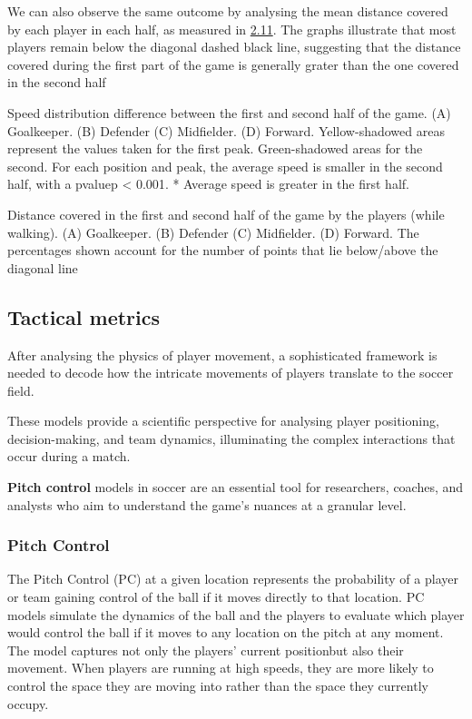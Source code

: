 \documentclass[twoside,nohyper]{tufte-book}
\begin{document}
We can also observe the same outcome by analysing the mean distance
covered by each player in each half, as measured in
\protect\hyperlink{f2.11}{2.11}. The graphs
illustrate that most players remain below the diagonal dashed black
line, suggesting that the distance covered during the first part of the
game is generally grater than the one covered in the second half

Speed distribution difference between the first and second
half of the game. (A) Goalkeeper. (B)
Defender (C) Midfielder. (D) Forward.
Yellow-shadowed areas represent the values taken for the first peak.
Green-shadowed areas for the second. For each position and peak, the
average speed is smaller in the second half, with a {pvaluep \textless{} 0.001}.
* Average speed is greater in the first
half.

Distance covered in the first and second half of the game
by the players (while walking). (A) Goalkeeper.
(B) Defender (C) Midfielder.
(D) Forward. The percentages shown account for the
number of points that lie below/above the diagonal line

\hypertarget{tactical-metrics-1}{%
\subsection{Tactical metrics}\label{tactical-metrics-1}}

After analysing the physics of player movement, a sophisticated
framework is needed to decode how the intricate movements of players
translate to the soccer field.

These models provide a scientific perspective for analysing player
positioning, decision-making, and team dynamics, illuminating the
complex interactions that occur during a match.

\textbf{Pitch control} models \citep{Spearman} in soccer are an essential tool for
researchers, coaches, and analysts who aim to understand the game's
nuances at a granular level.

\hypertarget{pitch-control-1}{%
\subsubsection{Pitch Control}\label{pitch-control-1}}

The Pitch Control (PC) at a given location represents the probability of
a player or team gaining control of the ball if it moves directly to
that location. PC models simulate the dynamics of the ball and the
players to evaluate which player would control the ball if it moves to
any location on the pitch at any moment. The model captures not only the
players' current positionbut also their movement. When players are
running at high speeds, they are more likely to control the space they
are moving into rather than the space they currently occupy.
\end{document}
